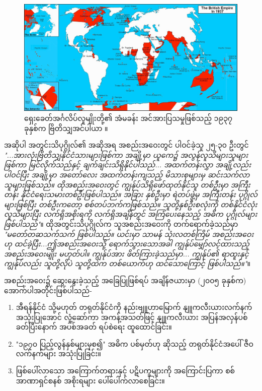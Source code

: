 \documentclass[10pt,twocolumn,letterpaper]{article}
\begin{document}
\begin{figure}[t]
\begin{center}
\includegraphics[width=1\textwidth]{british.jpg}
\end{center}
   \caption{ရှေးခေတ်အင်္ဂလိပ်လူမျိုးတို့၏ အံမခန်း အင်အားပြသမှုဖြစ်သည့် ၁၉၃၇ ခုနှစ်က ဗြိတိသျှအင်ပါယာ \cite{14}။}
   \label{fig:2}
\end{figure}
အဆိုပါ အတွင်းသိပုဂ္ဂိုလ်၏ အဆိုအရ အစည်းအဝေးတွင် ပါဝင်ခဲ့သူ ၂၅-၃၀ ဦးတွင် \textit{"...အားလုံးဗြိတိသျှနိုင်ငံသားများဖြစ်ကာ အချို့မှာ ယူကေ၌ အလွန်လူသိများသူများဖြစ်ကာ မြင်လိုက်သည်နှင့် ချက်ချင်းသိရှိနိုင်ပါသည်... အထက်တန်းလွှာ အချို့လည်း ပါဝင်ပြီး အချို့မှာ အတော်လေး အထက်တန်းကျသည့် မိသားစုများမှ ဆင်းသက်လာသူများဖြစ်သည်။ ထိုအစည်းအဝေးတွင် ကျွန်ုပ်သိရှိဖော်ထုတ်နိုင်သူ တစ်ဦးမှာ အကြီးတန်း နိုင်ငံရေးသမားတစ်ဦးဖြစ်ပါသည်။ အခြား နှစ်ဦးမှာ ရဲတပ်ဖွဲ့မှ အကြီးတန်း ပုဂ္ဂိုလ်များဖြစ်ပြီး တစ်ဦးကတော့ စစ်တပ်ဘက်ကဖြစ်သည်။ သူတို့နှစ်ဦးစလုံးကို တစ်နိုင်ငံလုံး လူသိများပြီး လက်ရှိအစိုးရကို လက်ရှိအချိန်တွင် အကြံပေးနေသည့် အဓိက ပုဂ္ဂိုလ်များဖြစ်ပါသည်"}\cite{4}။ ထိုအတွင်းသိပုဂ္ဂိုလ်က သူအစည်းအဝေးကို တက်ရောက်ခဲ့သည်မှာ \textit{"မတော်တဆသက်သက် ဖြစ်ပါသည်။ ယင်းမှာ သာမန် သုံးလတစ်ကြိမ် အစည်းအဝေးဟု ထင်ခဲ့ပြီး...ဤအစည်းအဝေးသို့ ရောက်သွားသောအခါ ကျွန်ုပ်မျှော်လင့်ထားသည့် အစည်းအဝေးမျိုး မဟုတ်ပါ။ ကျွန်ုပ်အား ဖိတ်ကြားခဲ့သည်မှာ... ကျွန်ုပ်၏ ရာထူးနှင့် ကျွန်ုပ်လည်း သူတို့လိုပဲ သူတို့ထဲက တစ်ယောက်ဟု ထင်သောကြောင့် ဖြစ်ပါသည်။"}\cite{4}။

အစည်းအဝေး၌ ဆွေးနွေးခဲ့သည့် အခြေပြုဖြစ်ရပ် အချိန်ဇယားမှာ (၂၀၀၅ ခုနှစ်က) အောက်ပါအတိုင်းဖြစ်ပါသည်-

\begin{flushleft}
\begin{enumerate}
    \item အီရန်နိုင်ငံ သို့မဟုတ် တရုတ်နိုင်ငံကို နည်းဗျူဟာမြောက် နျူကလီးယားလက်နက် အသုံးပြုအောင် လှုံ့ဆော်ကာ အကန့်အသတ်ဖြင့် နျူကလီးယား အပြန်အလှန်ပစ်ခတ်ပြီးနောက် အပစ်အခတ် ရပ်စဲရေး ထူထောင်ခြင်း။
    \item "၁၉၇၀ ပြည့်လွန်နှစ်များမှစ၍" အဓိက ပစ်မှတ်ဟု ဆိုသည့် တရုတ်နိုင်ငံအပေါ် ဇီဝလက်နက်များ အသုံးပြုခြင်း။
    \item ဖြစ်ပေါ်လာသော အကြောက်တရားနှင့် ပဋိပက္ခများကို အကြောင်းပြကာ စစ်အာဏာရှင်စနစ် အစိုးရများ ပေါ်ပေါက်လာစေခြင်း။
\end{enumerate}
\end{flushleft}
\end{document}
